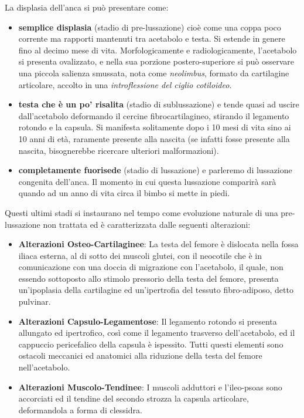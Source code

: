 La displasia dell'anca si può presentare come:
\begin{itemize}
\item \textbf{semplice displasia} (stadio di pre-lussazione) cioè come una coppa poco corrente ma rapporti mantenuti tra acetabolo e testa. Si estende in genere fino al decimo mese di vita. Morfologicamente e radiologicamente, l'acetabolo si presenta ovalizzato, e nella sua porzione postero-superiore si può osservare una piccola salienza smussata, nota come \emph{neolimbus}, formato da cartilagine articolare, accolto in una \emph{introflessione del ciglio cotiloideo}.
\item \textbf{testa che è un po' risalita} (stadio di sublussazione) e tende quasi ad uscire dall'acetabolo deformando il cercine fibrocartilagineo, stirando il legamento rotondo e la capsula.
Si manifesta solitamente dopo i 10 mesi di vita sino ai 10 anni di età, raramente presente alla nascita (se infatti fosse presente alla nascita, bisognerebbe ricercare ulteriori malformazioni).
\item \textbf{completamente fuorisede} (stadio di lussazione) e parleremo di lussazione congenita dell'anca. Il momento in cui questa lussazione comparirà sarà quando ad un anno di vita circa il bimbo si mette in piedi.
\end{itemize}

Questi ultimi stadi si instaurano nel tempo come evoluzione naturale di una pre-lussazione non trattata ed è caratterizzata dalle seguenti alterazioni:

\begin{itemize}
\item
  \textbf{Alterazioni Osteo-Cartilaginee}: La testa del femore è dislocata nella fossa iliaca esterna, al di sotto dei muscoli glutei, con il neocotile che è in comunicazione con una doccia di migrazione con l'acetabolo, il quale, non essendo sottoposto allo stimolo pressorio della testa del femore, presenta un'ipoplasia della cartilagine ed un'ipertrofia del tessuto fibro-adiposo, detto pulvinar.
\item
  \textbf{Alterazioni Capsulo-Legamentose}: Il legamento rotondo si presenta allungato ed ipertrofico, così come il legamento trasverso dell'acetabolo, ed il cappuccio pericefalico della capsula è ispessito. Tutti questi elementi sono ostacoli meccanici ed anatomici alla riduzione della testa del femore nell'acetabolo.
\item
  \textbf{Alterazioni Muscolo-Tendinee}: I muscoli adduttori e l'ileo-psoas sono accorciati ed il tendine del secondo strozza la capsula articolare, deformandola a forma di clessidra.
\end{itemize}

